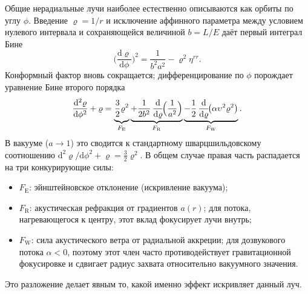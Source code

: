 \documentclass[12pt,a4paper,preprint]{elsarticle}
\begin{document}
            Общие нерадиальные лучи наиболее естественно описываются как орбиты по углу $\phi$. Введение $\varrho=1/r$ и исключение аффинного параметра между условием нулевого интервала и сохраняющейся величиной $b=L/E$ даёт первый интеграл Бине
            \begin{equation}
                \Biggl(\frac{\mathrm{d}\varrho}{\mathrm{d}\phi}\Biggr)^{2} = \frac{1}{b^{2}a^{2}} - \varrho^{2}\eta^{rr} .
                \label{eq:binet-first-acoustic}
            \end{equation}
            Конформный фактор вновь сокращается; дифференцирование по $\phi$ порождает уравнение Бине второго порядка
            \begin{equation}
                \frac{\mathrm{d}^{2}\varrho}{\mathrm{d}\phi^{2}} + \varrho = \underbrace{\vphantom{\frac{\mathrm{d}}{\mathrm{d}\varrho}\Bigl(\frac{1}{a^{2}}\Bigr)}\frac{3}{2}\varrho^{2}}_{F_{\mathrm{E}}} \underbrace{+ \frac{1}{2b^{2}}\,\frac{\mathrm{d}}{\mathrm{d}\varrho}\!\Bigl(\frac{1}{a^{2}}\Bigr)}_{F_{\mathrm{R}}} \underbrace{- \vphantom{\frac{\mathrm{d}}{\mathrm{d}\varrho}\Bigl(\frac{1}{a^{2}}\Bigr)}\frac{1}{2}\,\frac{\mathrm{d}}{\mathrm{d}\varrho}\!\bigl(\alpha\upsilon^{2}\varrho^{2}\bigr)}_{F_{\mathrm{W}}} .
                \label{eq:binet-second-acoustic}
            \end{equation}
            В вакууме ($a\to 1$) это сводится к стандартному шварцшильдовскому соотношению $\mathrm{d}^{2}\varrho/\mathrm{d}\phi^{2}+\varrho=\frac{3}{2}\varrho^{2}$. В общем случае правая часть распадается на три конкурирующие силы:
            \begin{itemize}
                \item $F_{\mathrm{E}}$: эйнштейновское отклонение (искривление вакуума);
                \item $F_{\mathrm{R}}$: акустическая рефракция от градиентов $a(r)$; для потока, нагревающегося к центру, этот вклад фокусирует лучи внутрь;
                \item $F_{\mathrm{W}}$: сила акустического ветра от радиальной аккреции; для дозвукового потока $\alpha<0$, поэтому этот член часто противодействует гравитационной фокусировке и сдвигает радиус захвата относительно вакуумного значения.
            \end{itemize}
            Это разложение делает явным то, какой именно эффект искривляет данный луч.
\end{document}
